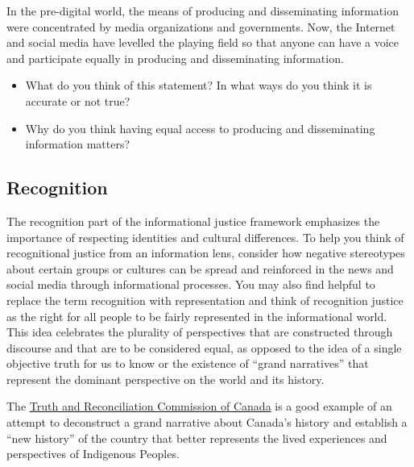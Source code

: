\documentclass[
  letterpaper,
  DIV=11,
  numbers=noendperiod]{scrreprt}
\begin{document}
\begin{tcolorbox}[enhanced jigsaw, arc=.35mm, bottomrule=.15mm, bottomtitle=1mm, breakable, colback=white, colbacktitle=quarto-callout-tip-color!10!white, colframe=quarto-callout-tip-color-frame, coltitle=black, left=2mm, leftrule=.75mm, opacityback=0, opacitybacktitle=0.6, rightrule=.15mm, title=\textcolor{quarto-callout-tip-color}{\faLightbulb}\hspace{0.5em}{Pause and reflect}, titlerule=0mm, toprule=.15mm, toptitle=1mm]

In the pre-digital world, the means of producing and disseminating
information were concentrated by media organizations and governments.
Now, the Internet and social media have levelled the playing field so
that anyone can have a voice and participate equally in producing and
disseminating information.

\begin{itemize}
\item
  What do you think of this statement? In what ways do you think it is
  accurate or not true?
\item
  Why do you think having equal access to producing and disseminating
  information matters?
\end{itemize}

\end{tcolorbox}

\subsection{Recognition}\label{recognition}

The recognition part of the informational justice framework emphasizes
the importance of respecting identities and cultural differences. To
help you think of recognitional justice from an information lens,
consider how negative stereotypes about certain groups or cultures can
be spread and reinforced in the news and social media through
informational processes. You may also find helpful to replace the term
recognition with representation and think of recognition justice as the
right for all people to be fairly represented in the informational
world. This idea celebrates the plurality of perspectives that are
constructed through discourse and that are to be considered equal, as
opposed to the idea of a single objective truth for us to know or the
existence of ``grand narratives'' that represent the dominant
perspective on the world and its history.

The
\href{https://www.rcaanc-cirnac.gc.ca/eng/1450124405592/1529106060525}{Truth
and Reconciliation Commission of Canada} is a good example of an attempt
to deconstruct a grand narrative about Canada's history and establish a
``new history'' of the country that better represents the lived
experiences and perspectives of Indigenous Peoples.
\end{document}
